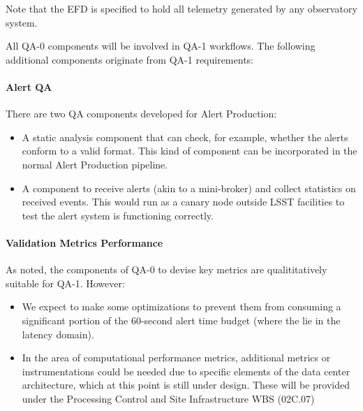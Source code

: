 Note that the EFD is specified to hold all telemetry generated by any observatory system.

All QA-0 components will be involved in QA-1 workflows. The following additional components originate from QA-1 requirements:

\paragraph{Alert QA}
\label{sec:qaAlertQA}

There are two QA components developed for Alert Production:

\begin{itemize}

\item A static analysis component that can check, for example, whether the alerts conform to a valid format. This kind of component can be incorporated in the normal Alert Production pipeline.

\item A component to receive alerts (akin to a mini-broker) and collect statistics on received events. This would run as a canary node outside LSST facilities to test the alert system is functioning correctly.

\end{itemize}

\paragraph{Validation Metrics Performance}
\label{sec:qaPerfValidate}

As noted, the components of QA-0 to devise key metrics are
qualititatively suitable for QA-1. However:

\begin{itemize}

\item We expect to make some optimizations to prevent them from consuming a significant portion of the 60-second alert time budget (where the lie in the latency domain). 

\item In the area of computational performance metrics, additional metrics or instrumentations could be needed due to specific elements of the data center architecture, which at this point is still under design. These will be provided under the Processing Control and Site Infrastructure WBS (02C.07)

\end{itemize}

